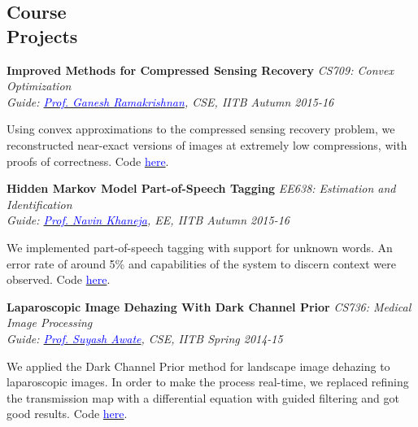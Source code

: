 \documentclass[margin,line]{res}
\newenvironment{list1}{
  \begin{list}{\ding{113}}{%
      \setlength{\itemsep}{0in}
      \setlength{\parsep}{0in} \setlength{\parskip}{0in}
      \setlength{\topsep}{0in} \setlength{\partopsep}{0in} 
      \setlength{\leftmargin}{0.17in}}}{\end{list}}
\begin{document}
\begin{resume}
\section{\sc Course \\Projects}
{\bf Improved Methods for Compressed Sensing Recovery} \hfill {\it CS709: Convex Optimization} \\
{\em Guide: \href{https://www.cse.iitb.ac.in/~ganesh/}{\textcolor{blue}{Prof. Ganesh Ramakrishnan}}, CSE, IITB \hfill Autumn 2015-16} \\
\vspace*{-.15in}
\begin{list1}
\item[] Using convex approximations to the compressed sensing recovery problem, we reconstructed near-exact versions of images at extremely low compressions, with proofs of correctness. Code \href{https://github.com/alankarkotwal/cs-rank-minimization}{\textcolor{blue} {here}}.
\end{list1}

\vspace*{-0.1in}

{\bf Hidden Markov Model Part-of-Speech Tagging} \hfill \textit{EE638: Estimation and Identification} \\
{\em Guide: \href{https://www.ee.iitb.ac.in/course/~ee638/Navin}{\textcolor{blue}{Prof. Navin Khaneja}}, EE, IITB \hfill Autumn 2015-16} \\
\vspace*{-.15in}
\begin{list1}
\item[] We implemented part-of-speech tagging with support for unknown words. An error rate of around 5\% and capabilities of the system to discern context were observed. Code \href{https://github.com/alankarkotwal/pos-tagging}{\textcolor{blue} {here}}.
\end{list1}

\vspace*{-0.1in}

{\bf Laparoscopic Image Dehazing With Dark Channel Prior} \hfill \textit{CS736: Medical Image Processing} \\
{\em Guide: \href{https://www.cse.iitb.ac.in/~suyash}{\textcolor{blue}{Prof. Suyash Awate}}, CSE, IITB \hfill Spring 2014-15} \\
\vspace*{-.15in}
\begin{list1}
\item[] We applied the Dark Channel Prior method for landscape image dehazing to laparoscopic images. In order to make the process real-time, we replaced refining the transmission map with a differential equation with guided filtering and got good results. Code \href{https://github.com/riddhishb/Laproscopic-Image-Dehazing}{\textcolor{blue} {here}}.
\end{list1}


\end{resume}
\end{document}
